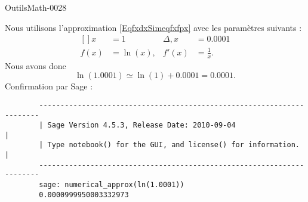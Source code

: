 
\begin{corrige}{OutilsMath-0028}

	Nous utilisons l'approximation \eqref{EqfxdxSimeqfxfpx} avec les paramètres suivants :
	\begin{equation}
		\begin{aligned}[]
			x&=1&\Delta, x&=0.0001\\
			f(x)&=\ln(x),&f'(x)&=\frac{1}{ x }.
		\end{aligned}
	\end{equation}
	Nous avons donc
	\begin{equation}
		\ln(1.0001)\simeq \ln(1)+0.0001=0.0001.
	\end{equation}
	Confirmation par Sage :
	\begin{verbatim}
		----------------------------------------------------------------------
		| Sage Version 4.5.3, Release Date: 2010-09-04                       |
		| Type notebook() for the GUI, and license() for information.        |
		----------------------------------------------------------------------
		sage: numerical_approx(ln(1.0001))
		0.0000999950003332973
	\end{verbatim}

\end{corrige}
